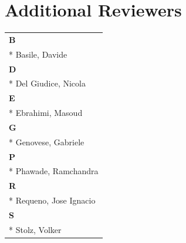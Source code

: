\documentclass[]{llncs}
\begin{document}
\section*{Additional Reviewers}
\begin{longtable}{l}
\textbf{B} \\*
Basile, Davide
\\
\textbf{D} \\*
Del Giudice, Nicola
\\
\textbf{E} \\*
Ebrahimi, Masoud
\\
\textbf{G} \\*
Genovese, Gabriele
\\
\textbf{P} \\*
Phawade, Ramchandra
\\
\textbf{R} \\*
Requeno, Jose Ignacio
\\
\textbf{S} \\*
Stolz, Volker
\\
\end{longtable}
\end{document}
